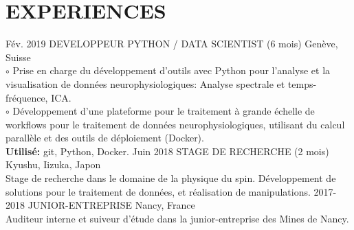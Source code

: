 \documentclass[]{cv-style}
\begin{document}
\section{EXPERIENCES}
\begin{entrylist}
%
\entry
{Fév. 2019}
{DEVELOPPEUR PYTHON / DATA SCIENTIST (6 mois)}
{Genève, Suisse}
{\\
    $\circ$ Prise en charge du développement d'outils avec Python pour 
    l'analyse et la visualisation de données neurophysiologiques: Analyse 
    spectrale et temps-fréquence, ICA.\\
    $\circ$ Développement d'une plateforme pour le traitement à grande échelle 
    de workflows pour le traitement de données neurophysiologiques, utilisant 
    du calcul parallèle et des outils de déploiement (Docker). \\
\textbf{Utilisé:} git, Python, Docker.
\vspace{0.2cm}
}
\entry
{Juin 2018}
{STAGE DE RECHERCHE (2 mois)}
{Kyushu, Iizuka, Japon}
{\\
    Stage de recherche dans le domaine de la physique du spin. Développement 
    de solutions pour le traitement de données, et réalisation de 
    manipulations. 
\vspace{0.2cm}
}
\entry
{2017-2018}
{JUNIOR-ENTREPRISE}
{Nancy, France}
{\\
    Auditeur interne et suiveur d'étude dans la junior-entreprise des Mines 
    de Nancy.
\vspace{0.2cm}
}
%
\end{entrylist}
\newpage
\hphantom\\
%
\end{document}
